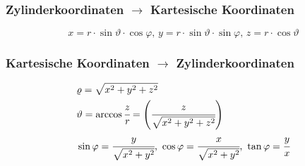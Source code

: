 \documentclass[a4paper,10pt]{scrartcl}
\begin{document}
            \subsubsection*{Zylinderkoordinaten \(\rightarrow\) Kartesische Koordinaten}
                \begin{equation*}
                    x = r \cdot \sin \vartheta \cdot \cos \varphi \text{, } y = r \cdot \sin \vartheta \cdot \sin \varphi \text{, } z = r \cdot \cos \vartheta
                \end{equation*}
            \subsubsection*{Kartesische Koordinaten \(\rightarrow\) Zylinderkoordinaten}
            \begin{equation}
                \begin{aligned}
                    & \varrho = \sqrt{x^2 + y^2 + z^2} \\
                    & \vartheta = \arccos \cfrac{z}{r} = \Bigg( \cfrac{z}{\sqrt{x^2 + y^2 + z^2}} \Bigg) \\
                    & \sin \varphi = \cfrac{y}{\sqrt{x^2 + y^2}} \text{, } \cos \varphi = \cfrac{x}{\sqrt{x^2 + y^2}} \text{, } \tan \varphi = \cfrac{y}{x}  
                \end{aligned}
            \end{equation}
            
\end{document}
